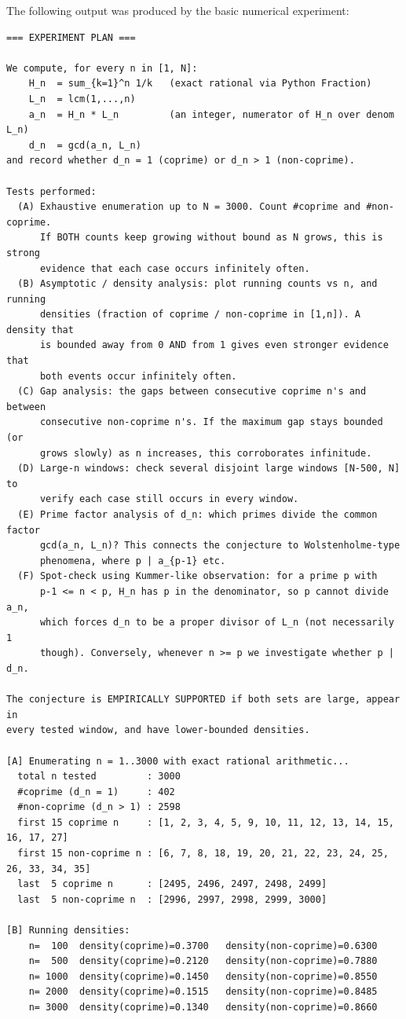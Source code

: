 \documentclass[11pt]{article}
\begin{document}
The following output was produced by the basic numerical experiment:

\begin{lstlisting}
=== EXPERIMENT PLAN ===

We compute, for every n in [1, N]:
    H_n  = sum_{k=1}^n 1/k   (exact rational via Python Fraction)
    L_n  = lcm(1,...,n)
    a_n  = H_n * L_n         (an integer, numerator of H_n over denom L_n)
    d_n  = gcd(a_n, L_n)
and record whether d_n = 1 (coprime) or d_n > 1 (non-coprime).

Tests performed:
  (A) Exhaustive enumeration up to N = 3000. Count #coprime and #non-coprime.
      If BOTH counts keep growing without bound as N grows, this is strong
      evidence that each case occurs infinitely often.
  (B) Asymptotic / density analysis: plot running counts vs n, and running
      densities (fraction of coprime / non-coprime in [1,n]). A density that
      is bounded away from 0 AND from 1 gives even stronger evidence that
      both events occur infinitely often.
  (C) Gap analysis: the gaps between consecutive coprime n's and between
      consecutive non-coprime n's. If the maximum gap stays bounded (or
      grows slowly) as n increases, this corroborates infinitude.
  (D) Large-n windows: check several disjoint large windows [N-500, N] to
      verify each case still occurs in every window.
  (E) Prime factor analysis of d_n: which primes divide the common factor
      gcd(a_n, L_n)? This connects the conjecture to Wolstenholme-type
      phenomena, where p | a_{p-1} etc.
  (F) Spot-check using Kummer-like observation: for a prime p with
      p-1 <= n < p, H_n has p in the denominator, so p cannot divide a_n,
      which forces d_n to be a proper divisor of L_n (not necessarily 1
      though). Conversely, whenever n >= p we investigate whether p | d_n.

The conjecture is EMPIRICALLY SUPPORTED if both sets are large, appear in
every tested window, and have lower-bounded densities.

[A] Enumerating n = 1..3000 with exact rational arithmetic...
  total n tested         : 3000
  #coprime (d_n = 1)     : 402
  #non-coprime (d_n > 1) : 2598
  first 15 coprime n     : [1, 2, 3, 4, 5, 9, 10, 11, 12, 13, 14, 15, 16, 17, 27]
  first 15 non-coprime n : [6, 7, 8, 18, 19, 20, 21, 22, 23, 24, 25, 26, 33, 34, 35]
  last  5 coprime n      : [2495, 2496, 2497, 2498, 2499]
  last  5 non-coprime n  : [2996, 2997, 2998, 2999, 3000]

[B] Running densities:
    n=  100  density(coprime)=0.3700   density(non-coprime)=0.6300
    n=  500  density(coprime)=0.2120   density(non-coprime)=0.7880
    n= 1000  density(coprime)=0.1450   density(non-coprime)=0.8550
    n= 2000  density(coprime)=0.1515   density(non-coprime)=0.8485
    n= 3000  density(coprime)=0.1340   density(non-coprime)=0.8660


\end{lstlisting}
\end{document}
